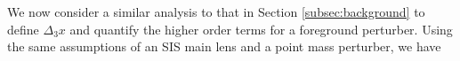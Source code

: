 We now consider a similar analysis to that in Section \ref{subsec:background} to define $\Delta_3 x$ and quantify the higher order terms for a foreground perturber. Using the same assumptions of an SIS main lens and a point mass perturber, we have